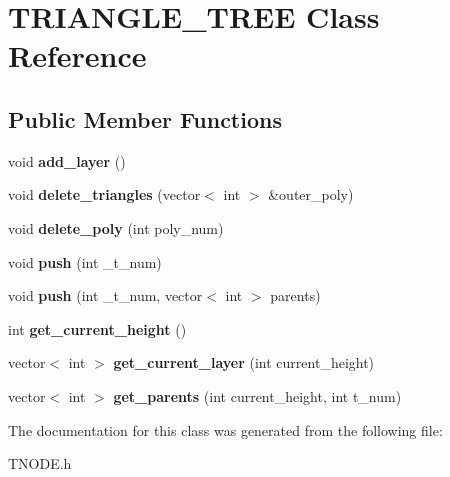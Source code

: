 \hypertarget{class_t_r_i_a_n_g_l_e___t_r_e_e}{}\section{T\+R\+I\+A\+N\+G\+L\+E\+\_\+\+T\+R\+EE Class Reference}
\label{class_t_r_i_a_n_g_l_e___t_r_e_e}
\subsection*{Public Member Functions}
\begin{DoxyCompactItemize}
\item 
\mbox{\label{class_t_r_i_a_n_g_l_e___t_r_e_e_a04f9d1d56844fc5dea90ff7f27ff90d4}} 
void {\bfseries add\+\_\+layer} ()
\item 
\mbox{\label{class_t_r_i_a_n_g_l_e___t_r_e_e_a0537edf3f5dc4c26d277af17a8a2cb87}} 
void {\bfseries delete\+\_\+triangles} (vector$<$ int $>$ \&outer\+\_\+poly)
\item 
\mbox{\label{class_t_r_i_a_n_g_l_e___t_r_e_e_acfdecc6d737bbf42279c0377493c1638}} 
void {\bfseries delete\+\_\+poly} (int poly\+\_\+num)
\item 
\mbox{\label{class_t_r_i_a_n_g_l_e___t_r_e_e_a4198063d26710c0a72d25dc577c4ffdc}} 
void {\bfseries push} (int \+\_\+t\+\_\+num)
\item 
\mbox{\label{class_t_r_i_a_n_g_l_e___t_r_e_e_a0e94245be77ec879d10226a338699eb5}} 
void {\bfseries push} (int \+\_\+t\+\_\+num, vector$<$ int $>$ parents)
\item 
\mbox{\label{class_t_r_i_a_n_g_l_e___t_r_e_e_aeab40a744c30c0a23fbcff0d1ec8295d}} 
int {\bfseries get\+\_\+current\+\_\+height} ()
\item 
\mbox{\label{class_t_r_i_a_n_g_l_e___t_r_e_e_a6b4b641cf87c2b7e8f453566aeff246e}} 
vector$<$ int $>$ {\bfseries get\+\_\+current\+\_\+layer} (int current\+\_\+height)
\item 
\mbox{\label{class_t_r_i_a_n_g_l_e___t_r_e_e_aacdd0263f3b219036b12750977e043da}} 
vector$<$ int $>$ {\bfseries get\+\_\+parents} (int current\+\_\+height, int t\+\_\+num)
\end{DoxyCompactItemize}


The documentation for this class was generated from the following file\+:\begin{DoxyCompactItemize}
\item 
T\+N\+O\+D\+E.\+h\end{DoxyCompactItemize}
